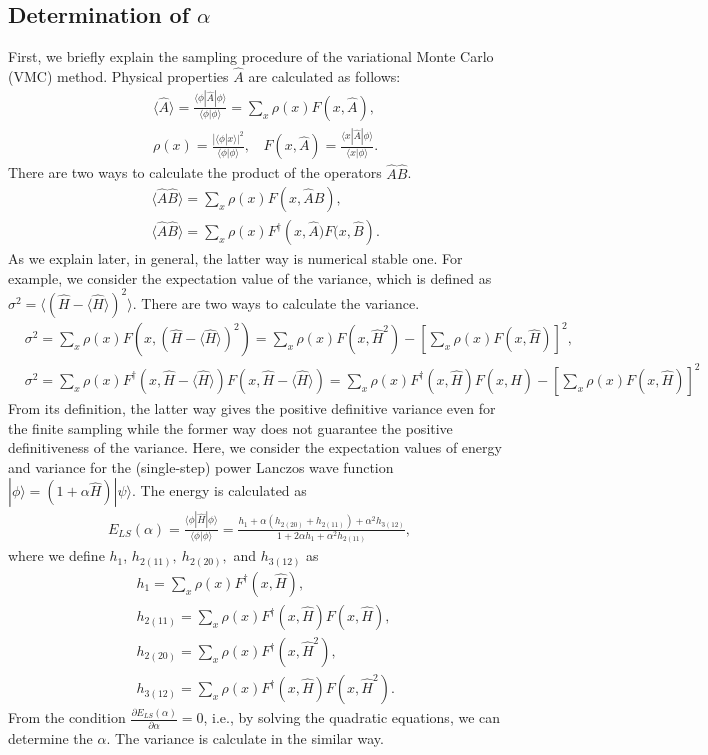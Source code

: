 \subsection{Determination of $\alpha$}
First, we briefly explain the sampling procedure of the variational Monte Carlo (VMC) method.
Physical properties $\hat{A}$ are calculated as follows:
\begin{align}
&\langle \hat{A}\rangle = \frac{\langle \phi| \hat{A}|\phi \rangle}{\langle \phi| \phi \rangle} = \sum_{x} \rho(x) F(x, {\hat{A}}),\\
& \rho(x)=\frac{|\langle \phi|x\rangle|^2}{\langle \phi | \phi \rangle}, ~~~~F(x,  {\hat{A}}) =  \frac{\langle x| \hat{A}|\phi \rangle}{\langle x| \phi \rangle}.
\end{align}
There are two ways to calculate the product of the operators  $\hat{A}\hat{B}$.
\begin{align}
&\langle \hat{A} \hat{B}\rangle = \sum_{x} \rho(x) F(x, {\hat{A}\hat{B}}),\\
&\langle \hat{A} \hat{B}\rangle = \sum_{x} \rho(x) F^{\dag}(x, {\hat{A})F(x, \hat{B}}).
\end{align}
As we explain later, in general, the latter way is numerical stable one. 
For example, we consider the expectation value of the variance, 
which is defined as $\sigma^2=\langle (\hat{H}-\langle \hat{H}\rangle)^2\rangle$. There are two ways to calculate the variance.
\begin{align}
&\sigma^2=\sum_{x} \rho(x) F(x,  (\hat{H}-\langle \hat{H}\rangle)^2) = \sum_{x} \rho(x) F(x,  \hat{H}^2) - \left[ \sum_{x} \rho(x) F(x,  \hat{H})\right]^2 ,\\
&\sigma^2=\sum_{x} \rho(x) F^{\dag}(x,  \hat{H}-\langle \hat{H}\rangle)F(x,  \hat{H}-\langle \hat{H}\rangle) = \sum_{x} \rho(x) F^{\dag}(x,  \hat{H}) F(x, \hat{H})- \left[ \sum_{x} \rho(x) F(x,  \hat{H})\right]^2 
\end{align}
From its definition, the latter way gives the positive definitive variance even for the finite sampling while the former way does not guarantee the positive definitiveness of the variance. Here, we consider the expectation values of energy and variance for the (single-step) power Lanczos wave function $|\phi\rangle =(1+\alpha \hat{H}) |\psi \rangle$. The energy is calculated as
\begin{align}
E_{LS}(\alpha) =\frac{\langle \phi| \hat{H} |\phi\rangle}{\langle \phi|\phi\rangle}=\frac{h_1 + \alpha(h_{2(20)} + h_{2(11)}) + \alpha^2 h_{3(12)}}{1 + 2\alpha h_1 + \alpha^2 h_{2(11)}},
\end{align}
where we define $h_1$, $h_{2(11)},~h_{2(20)},$ and $h_{3(12)}$ as
\begin{align}
&h_1 =\sum_{x} \rho(x) F^{\dag}(x,  \hat{H}),\\
&h_{2(11)}=\sum_{x} \rho(x) F^{\dag}(x,  \hat{H}) F(x, \hat{H}),\\
&h_{2(20)}=\sum_{x} \rho(x) F^{\dag}(x,  \hat{H}^2),\\
&h_{3(12)}=\sum_{x} \rho(x) F^{\dag}(x,  \hat{H})F(x,  \hat{H}^2).
\end{align}
From the condition $\frac{\partial E_{LS}(\alpha)}{\partial \alpha}=0$, i.e., by solving the quadratic equations, we can determine the
 $\alpha$. The variance is calculate in the similar way.
